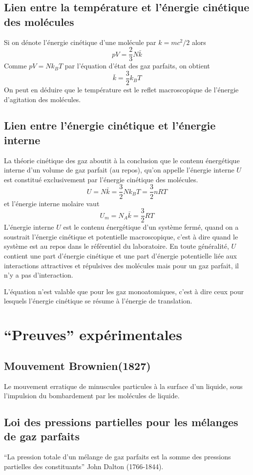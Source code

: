 \subsection{Lien entre la température et l'énergie cinétique des molécules}
Si on dénote l'énergie cinétique d'une molécule par $k = mc^2/2$ alors
\[ pV = \frac 23 N\bar k \]
Comme $pV = Nk_BT$ par l'équation d'état des gaz parfaits, on obtient
\[ \bar k = \frac 32 k_B T \]
On peut en déduire que le température est
le reflet macroscopique de l'énergie d'agitation des molécules.

\subsection{Lien entre l'énergie cinétique et l'énergie interne}
La théorie cinétique des gaz aboutit à la conclusion que
le contenu énergétique interne d'un volume de gaz parfait (au repos),
qu'on appelle l'énergie interne $U$ est constitué exclusivement
par l'énergie cinétique des molécules.
\[ U = N\bar k = \frac 32 Nk_BT = \frac 32nRT \]
et l'énergie interne molaire vaut
\[ U_m = N_A\bar k = \frac 32 RT \]
L'énergie interne $U$ est le contenu énergétique d'un système fermé,
quand on a soustrait l'énergie cinétique et potentielle macroscopique,
c'est à dire quand le système est au repos dans le référentiel du laboratoire.
En toute généralité, $U$ contient une part d'énergie cinétique et
une part d'énergie potentielle liée aux interactions attractives et
répulsives des molécules mais pour un gaz parfait, il n'y a pas d'interaction.

L'équation n'est valable que pour les gaz monoatomiques,
c'est à dire ceux pour lesquels l'énergie cinétique se résume à
l'énergie de translation.

\section{``Preuves'' expérimentales}
\subsection{Mouvement Brownien(1827)}
Le mouvement erratique de minuscules particules à la surface d'un liquide,
sous l'impulsion du bombardement par les molécules de liquide.

\subsection{Loi des pressions partielles pour les mélanges de gaz parfaits}
``La pression totale d'un mélange de gaz parfaits est
la somme des pressions partielles des constituants'' John Dalton (1766-1844).

